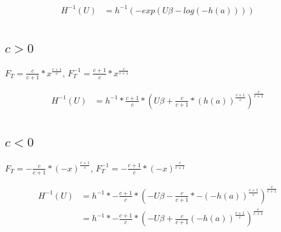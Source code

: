 \documentclass[]{article}
\begin{document}
\begin{align*}
H^{-1}(U) &= h^{-1} \left( - exp \left( U\beta - log(-h(a)) \right) \right) \\
\end{align*}


\subsection{$c > 0$}

$F_T = \frac{c}{c + 1} * x^{\frac{c + 1}{c}}$,
$F_T^{-1} = \frac{c + 1}{c} * x^{\frac{c}{c + 1}}$


\begin{align*}
H^{-1}(U) &= h^{-1} * \frac{c + 1}{c} * \left( U\beta + \frac{c}{c + 1} * (h(a))^{\frac{c + 1}{c}} \right)^{\frac{c}{c + 1}} \\
\end{align*}

\subsection{$c < 0$}

$F_T = - \frac{c}{c + 1} * (-x)^{\frac{c + 1}{c}}$,
$F_T^{-1} = - \frac{c + 1}{c} * (-x)^{\frac{c}{c + 1}}$


\begin{align*}
H^{-1}(U) &= h^{-1} * - \frac{c + 1}{c} * \left(- U\beta - \frac{c}{c + 1} * - (-h(a))^{\frac{c + 1}{c}} \right)^{\frac{c}{c + 1}} \\
&= h^{-1} * - \frac{c + 1}{c} * \left(- U\beta + \frac{c}{c + 1} (-h(a))^{\frac{c + 1}{c}} \right)^{\frac{c}{c + 1}} \\
\end{align*}
\end{document}
